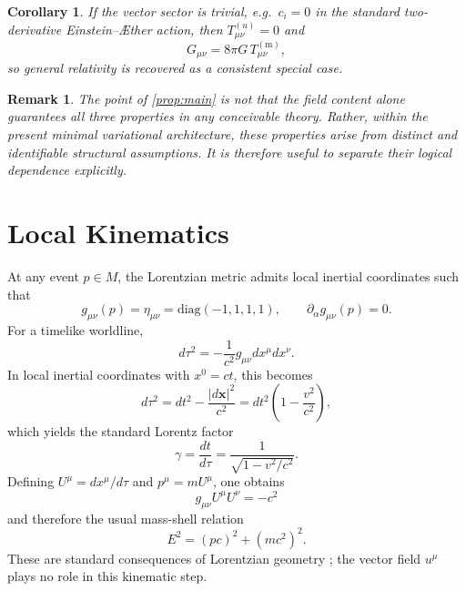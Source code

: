 \documentclass[12pt,a4paper]{article}
\newcommand{\AEther}{\AE{}ther}
\newtheorem{corollary}{Corollary}[proposition]
\newtheorem{remark}{Remark}
\newcommand{\Tmm}{T^{(\mathrm{m})}_{\mu\nu}}
\newcommand{\Tuu}{T^{(u)}_{\mu\nu}}
\begin{document}
            \begin{corollary}
                If the vector sector is trivial, e.g.\ $c_i=0$ in the standard two-derivative
                Einstein--\AEther{} action, then $\Tuu=0$ and
                \begin{equation}
                    G_{\mu\nu}=8\pi G\,\Tmm,
                \end{equation}
                so general relativity is recovered as a consistent special case.
            \end{corollary}
            
            \begin{remark}
                The point of \cref{prop:main} is not that the field content alone guarantees all
                three properties in any conceivable theory. Rather, within the present minimal
                variational architecture, these properties arise from distinct and identifiable
                structural assumptions. It is therefore useful to separate their logical
                dependence explicitly.
            \end{remark}
    
    \section{Local Kinematics}
        \label{sec:kinematics}
        
        At any event $p\in M$, the Lorentzian metric admits local inertial coordinates
        such that
        \begin{equation}
            g_{\mu\nu}(p)=\eta_{\mu\nu}=\mathrm{diag}(-1,1,1,1),
            \qquad
            \partial_\alpha g_{\mu\nu}(p)=0.
        \end{equation}
        For a timelike worldline,
        \begin{equation}
            d\tau^2 = -\frac{1}{c^2} g_{\mu\nu} dx^\mu dx^\nu.
        \end{equation}
        In local inertial coordinates with $x^0=ct$, this becomes
        \begin{equation}
            d\tau^2
            = dt^2 - \frac{|d\mathbf{x}|^2}{c^2}
            = dt^2\left(1-\frac{v^2}{c^2}\right),
        \end{equation}
        which yields the standard Lorentz factor
        \begin{equation}
            \gamma = \frac{dt}{d\tau} = \frac{1}{\sqrt{1-v^2/c^2}}.
        \end{equation}
        Defining $U^\mu=dx^\mu/d\tau$ and $p^\mu=mU^\mu$, one obtains
        \begin{equation}
            g_{\mu\nu}U^\mu U^\nu = -c^2
        \end{equation}
        and therefore the usual mass-shell relation
        \begin{equation}
            E^2 = (pc)^2 + (mc^2)^2.
            \label{eq:massshell}
        \end{equation}
        These are standard consequences of Lorentzian geometry
        \citep{misner1973,carroll2004,will2014}; the vector field $u^\mu$ plays no role
        in this kinematic step.
    
\end{document}
